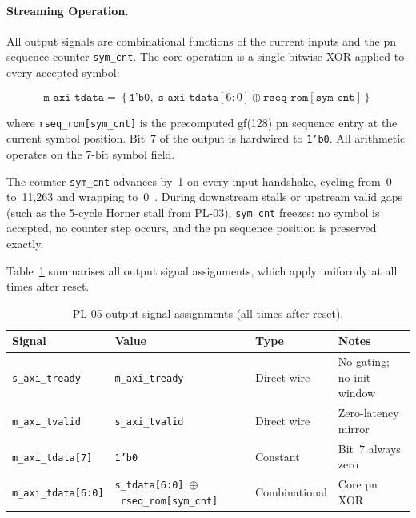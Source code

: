 
\FloatBarrier
\paragraph{Streaming Operation.}

All output signals are combinational functions of the current inputs and
the \ac{pn} sequence counter \texttt{sym\_cnt}.
The core operation is a single bitwise XOR applied to every accepted
symbol:

\begin{equation}
  \mathtt{m\_axi\_tdata} =
  \left\{
    \texttt{1'b0},\;
    \mathtt{s\_axi\_tdata}[6:0] \oplus
    \mathtt{rseq\_rom}[\mathtt{sym\_cnt}]
  \right\}
  \label{eq:randomizer_xor}
\end{equation}

\noindent where \texttt{rseq\_rom[sym\_cnt]} is the precomputed
\ac{gf}(128) \ac{pn} sequence entry at the current symbol position.
Bit~7 of the output is hardwired to \texttt{1'b0}. All arithmetic
operates on the 7-bit symbol field.

The counter \texttt{sym\_cnt} advances by~1 on every input handshake,
cycling from~0 to~11{,}263 and wrapping to~0~\cite{ITU_J83}.
During downstream stalls or upstream valid gaps (such as the 5-cycle
Horner stall from PL-03), \texttt{sym\_cnt} freezes: no symbol is
accepted, no counter step occurs, and the \ac{pn} sequence position is
preserved exactly.

Table~\ref{tab:pl05_signals} summarises all output signal assignments,
which apply uniformly at all times after reset.

\begin{table}[htbp]
  \caption{PL-05 output signal assignments (all times after reset).}
  \label{tab:pl05_signals}
  \centering
  \small
  \begin{tabular}{p{3.0cm}p{6.0cm}lp{3.0cm}}
    \hline
    Signal                       & Value                                                          & Type          & Notes \\
    \hline
    \texttt{s\_axi\_tready}      & \texttt{m\_axi\_tready}                                        & Direct wire   & No gating; no init window \\[2pt]
    \texttt{m\_axi\_tvalid}      & \texttt{s\_axi\_tvalid}                                        & Direct wire   & Zero-latency mirror \\[2pt]
    \texttt{m\_axi\_tdata[7]}    & \texttt{1'b0}                                                  & Constant      & Bit~7 always zero \\[2pt]
    \texttt{m\_axi\_tdata[6:0]}  & \texttt{s\_tdata[6:0]}~$\oplus$~\texttt{rseq\_rom[sym\_cnt]}  & Combinational & Core \ac{pn} XOR \\
    \hline
  \end{tabular}
\end{table}

